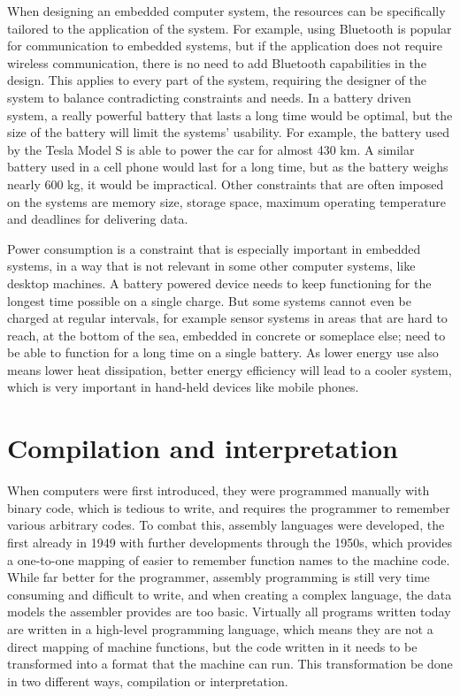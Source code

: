When designing an embedded computer system, the resources can be specifically tailored to the application of the system.
For example, using Bluetooth is popular for communication to embedded systems, but if the application does not require wireless communication, there is no need to add Bluetooth capabilities in the design.
This applies to every part of the system, requiring the designer of the system to balance contradicting constraints and needs.
In a battery driven system, a really powerful battery that lasts a long time would be optimal, but the size of the battery will limit the systems' usability.
For example, the battery used by the Tesla Model S is able to power the car for almost 430 km.
A similar battery used in a cell phone would last for a long time, but as the battery weighs nearly 600 kg, it would be impractical.
Other constraints that are often imposed on the systems are memory size, storage space, maximum operating temperature and deadlines for delivering data.

Power consumption is a constraint that is especially important in embedded systems, in a way that is not relevant in some other computer systems, like desktop machines.
A battery powered device needs to keep functioning for the longest time possible on a single charge.
But some systems cannot even be charged at regular intervals, for example sensor systems in areas that are hard to reach, at the bottom of the sea, embedded in concrete or someplace else; need to be able to function for a long time on a single battery.
As lower energy use also means lower heat dissipation, better energy efficiency will lead to a cooler system, which is very important in hand-held devices like mobile phones.

\section{Compilation and interpretation}
When computers were first introduced, they were programmed manually with binary code, which is tedious to write, and requires the programmer to remember various arbitrary codes.
To combat this, assembly languages were developed, the first already in 1949 with further developments through the 1950s, which provides a one-to-one mapping of easier to remember function names to the machine code.\citep{Salomon:1992:AL:152201}
While far better for the programmer, assembly programming is still very time consuming and difficult to write, and when creating a complex language, the data models the assembler provides are too basic.
Virtually all programs written today are written in a high-level programming language, which means they are not a direct mapping of machine functions, but the code written in it needs to be transformed into a format that the machine can run.\cite{dragon} 
This transformation be done in two different ways, compilation or interpretation. 

